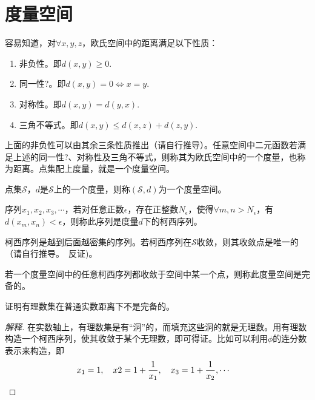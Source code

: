 
\section{度量空间}
\label{sec:metric-space}

容易知道，对$\forall x,y,z$，欧氏空间中的距离满足以下性质：
\begin{enumerate}
\item 非负性。即$d(x,y)\ge0.$
\item {\color{red}同一性?}。即$d(x,y)=0\iff x=y.$
\item 对称性。即$d(x,y)=d(y,x).$
\item 三角不等式。即$d(x,y)\le d(x,z)+d(z,y).$
\end{enumerate}

上面的非负性可以由其余三条性质推出（请自行推导）。任意空间中二元函数若满足上述的{\color{red}同一性?}、对称性及三角不等式，则称其为欧氏空间中的一个度量，也称为距离。点集配上度量，就是一个度量空间。

\begin{definition}
  点集$\mathcal{S}$，$d$是$\mathcal{S}$上的一个度量，则称$(\mathcal{S},d)$为一个度量空间。
\end{definition}

\begin{definition}
  序列$x_1,x_2,x_3,\cdots$，若对任意正数$\epsilon$，存在正整数$N_\epsilon$，使得$\forall m,n>N_\epsilon$，有$d(x_m,x_n)<\epsilon$，则称此序列是度量$d$下的柯西序列。
\end{definition}

柯西序列是越到后面越密集的序列。若柯西序列在$\mathcal{S}$收敛，则其收敛点是唯一的（请自行推导。\hints　反证)。

\begin{definition}[完备性]
  若一个度量空间中的任意柯西序列都收敛于空间中某一个点，则称此度量空间是完备的。
\end{definition}

\begin{example}[有理数集]
  证明有理数集在普通实数距离下不是完备的。
\end{example}
\begin{proof}[解释]
  在实数轴上，有理数集是有“洞”的，而填充这些洞的就是无理数。用有理数构造一个柯西序列，使其收敛于某个无理数，即可得证。比如可以利用$\phi$的连分数表示来构造，即
  \begin{align*}
    x_1=1,\quad x2=1+\frac1{x_1},\quad x_3=1+\frac1{x_2},\cdots &\qedhere
  \end{align*}
\end{proof}
